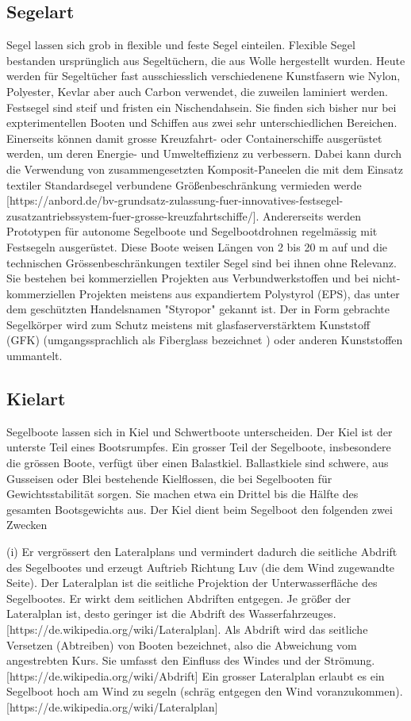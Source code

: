 \subsection{Segelart}
Segel lassen sich grob in flexible und feste Segel einteilen. Flexible Segel bestanden ursprünglich aus Segeltüchern, die aus  Wolle hergestellt wurden. Heute werden für Segeltücher fast ausschiesslich verschiedenene Kunstfasern wie Nylon, Polyester, Kevlar aber auch Carbon verwendet, die zuweilen laminiert werden. 
Festsegel sind steif und fristen ein Nischendahsein. Sie finden sich bisher nur bei expterimentellen Booten und Schiffen aus zwei sehr unterschiedlichen Bereichen. Einerseits können damit grosse Kreuzfahrt- oder Containerschiffe ausgerüstet werden, um deren Energie- und Umwelteffizienz zu verbessern. Dabei kann durch die Verwendung von zusammengesetzten Komposit-Paneelen die mit dem Einsatz textiler Standardsegel verbundene Größenbeschränkung vermieden werde [https://anbord.de/bv-grundsatz-zulassung-fuer-innovatives-festsegel-zusatzantriebssystem-fuer-grosse-kreuzfahrtschiffe/]. Andererseits werden Prototypen für autonome Segelboote und Segelbootdrohnen regelmässig mit Festsegeln ausgerüstet. Diese Boote weisen Längen von 2 bis 20 m auf und die technischen Grössenbeschränkungen textiler Segel sind bei ihnen ohne Relevanz. Sie bestehen bei kommerziellen Projekten aus Verbundwerkstoffen und bei nicht-kommerziellen Projekten meistens aus expandiertem Polystyrol (EPS), das unter dem geschützten Handelsnamen "Styropor" gekannt ist. Der in Form gebrachte Segelkörper wird zum Schutz meistens mit glasfaserverstärktem Kunststoff (GFK) (umgangssprachlich als Fiberglass bezeichnet ) oder anderen Kunststoffen ummantelt.  
\subsection{Kielart}
Segelboote lassen sich in Kiel und Schwertboote unterscheiden. Der Kiel ist der unterste Teil eines Bootsrumpfes. Ein grosser Teil der Segelboote, insbesondere die grössen Boote, verfügt über einen Balastkiel. Ballastkiele sind schwere, aus Gusseisen oder Blei bestehende Kielflossen, die bei Segelbooten für Gewichtsstabilität sorgen. Sie machen etwa ein Drittel bis die Hälfte des gesamten Bootsgewichts aus.
Der Kiel dient beim Segelboot den folgenden zwei Zwecken

(i) Er vergrössert den Lateralplans und vermindert dadurch die seitliche Abdrift des Segelbootes und erzeugt Auftrieb Richtung Luv  (die dem Wind zugewandte Seite). Der Lateralplan ist die seitliche Projektion der Unterwasserfläche des Segelbootes. Er wirkt dem seitlichen Abdriften entgegen. Je größer der Lateralplan ist, desto geringer ist die Abdrift des Wasserfahrzeuges.[https://de.wikipedia.org/wiki/Lateralplan]. Als Abdrift wird das seitliche Versetzen (Abtreiben) von Booten bezeichnet, also die Abweichung vom angestrebten Kurs. Sie umfasst den Einfluss des Windes und der  Strömung.  [https://de.wikipedia.org/wiki/Abdrift]
Ein grosser Lateralplan erlaubt es ein Segelboot hoch am Wind zu segeln (schräg entgegen den Wind voranzukommen). [https://de.wikipedia.org/wiki/Lateralplan]

